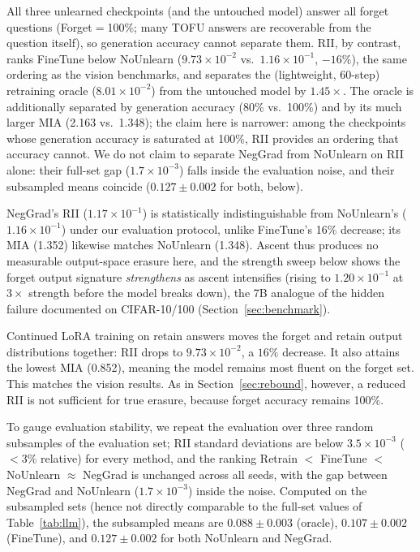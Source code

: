 \documentclass[smallextended]{svjour3}       %
\begin{document}
All three unlearned checkpoints (and the untouched model) answer all forget questions (Forget$=$100\%; many TOFU answers are recoverable from the question itself), so generation accuracy cannot separate them. RII, by contrast, ranks FineTune below NoUnlearn ($9.73{\times}10^{-2}$ vs.\ $1.16{\times}10^{-1}$, $-16\%$), the same ordering as the vision benchmarks, and separates the (lightweight, 60-step) retraining oracle ($8.01{\times}10^{-2}$) from the untouched model by $1.45\times$. The oracle is additionally separated by generation accuracy (80\% vs.\ 100\%) and by its much larger MIA (2.163 vs.\ 1.348); the claim here is narrower: among the checkpoints whose generation accuracy is saturated at 100\%, RII provides an ordering that accuracy cannot. We do not claim to separate NegGrad from NoUnlearn on RII alone: their full-set gap ($1.7{\times}10^{-3}$) falls inside the evaluation noise, and their subsampled means coincide ($0.127\pm0.002$ for both, below).

NegGrad's RII ($1.17{\times}10^{-1}$) is statistically indistinguishable from NoUnlearn's ($1.16{\times}10^{-1}$) under our evaluation protocol, unlike FineTune's 16\% decrease; its MIA (1.352) likewise matches NoUnlearn (1.348). Ascent thus produces no measurable output-space erasure here, and the strength sweep below shows the forget output signature \emph{strengthens} as ascent intensifies (rising to $1.20{\times}10^{-1}$ at $3\times$ strength before the model breaks down), the 7B analogue of the hidden failure documented on CIFAR-10/100 (Section~\ref{sec:benchmark}).

Continued LoRA training on retain answers moves the forget and retain output distributions together: RII drops to $9.73{\times}10^{-2}$, a $16\%$ decrease. It also attains the lowest MIA (0.852), meaning the model remains most fluent on the forget set. This matches the vision results. As in Section~\ref{sec:rebound}, however, a reduced RII is not sufficient for true erasure, because forget accuracy remains 100\%.

To gauge evaluation stability, we repeat the evaluation over three random subsamples of the evaluation set; RII standard deviations are below $3.5{\times}10^{-3}$ ($<$3\% relative) for every method, and the ranking Retrain $<$ \allowbreak FineTune $<$ \allowbreak NoUnlearn ${\approx}$ \allowbreak NegGrad is unchanged across all seeds, with the gap between NegGrad and NoUnlearn ($1.7{\times}10^{-3}$) inside the noise. Computed on the subsampled sets (hence not directly comparable to the full-set values of Table~\ref{tab:llm}), the subsampled means are $0.088\pm0.003$ (oracle), $0.107\pm0.002$ (FineTune), and $0.127\pm0.002$ for both NoUnlearn and NegGrad.
\end{document}

